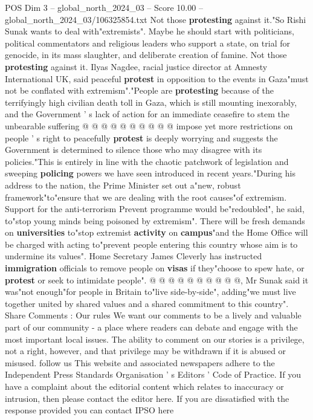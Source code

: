 \begin{textsample}{POS Dim 3 – global\_north\_2024\_03 – Score 10.00 – global\_north\_2024\_03/106325854.txt}
Not those \textbf{protesting} against it."So Rishi Sunak wants to deal with"extremists".
Maybe he should start with politicians, political commentators and religious leaders who support a state, on trial for genocide, in its mass slaughter, and deliberate creation of famine.
Not those \textbf{protesting} against it.
Ilyas Nagdee, racial justice director at Amnesty International UK, said peaceful \textbf{protest} in opposition to the events in Gaza"must not be conflated with extremism"."People are \textbf{protesting} because of the terrifyingly high civilian death toll in Gaza, which is still mounting inexorably, and the Government ' s lack of action for an immediate ceasefire to stem the unbearable suffering @ @ @ @ @ @ @ @ @ @ impose yet more restrictions on people ' s right to peacefully \textbf{protest} is deeply worrying and suggests the Government is determined to silence those who may disagree with its policies."This is entirely in line with the chaotic patchwork of legislation and sweeping \textbf{policing} powers we have seen introduced in recent years."During his address to the nation, the Prime Minister set out a"new, robust framework"to"ensure that we are dealing with the root causes"of extremism.
Support for the anti-terrorism Prevent programme would be"redoubled", he said, to"stop young minds being poisoned by extremism".
There will be fresh demands on \textbf{universities} to"stop extremist \textbf{activity} on \textbf{campus}"and the Home Office will be charged with acting to"prevent people entering this country whose aim is to undermine its values".
Home Secretary James Cleverly has instructed \textbf{immigration} officials to remove people on \textbf{visas} if they"choose to spew hate, or \textbf{protest} or seek to intimidate people". @ @ @ @ @ @ @ @ @ @, Mr Sunak said it was"not enough"for people in Britain to"live side-by-side", adding"we must live together united by shared values and a shared commitment to this country".
Share Comments : Our rules We want our comments to be a lively and valuable part of our community - a place where readers can debate and engage with the most important local issues.
The ability to comment on our stories is a privilege, not a right, however, and that privilege may be withdrawn if it is abused or misused. follow us This website and associated newspapers adhere to the Independent Press Standards Organisation ' s Editors ' Code of Practice.
If you have a complaint about the editorial content which relates to inaccuracy or intrusion, then please contact the editor here.
If you are dissatisfied with the response provided you can contact IPSO here

\end{textsample}
